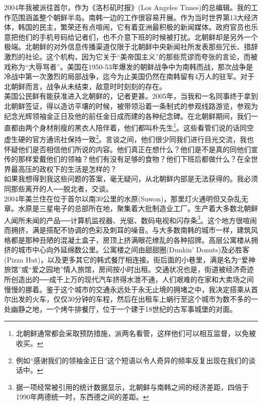 2004年我被派往首尔，作为《洛杉矶时报》(Los Angeles Times)的总编辑。我的工作范围涵盖整个朝鲜半岛。南韩一边的工作很容易开展。作为当时世界第13大经济体，韩国的民主，繁荣还有点喧闹，它有着亚洲最积极的新闻媒体。政府官员也乐意把他们的手机号码给记者们，也不介意下班的时候被打扰。北朝鲜却是另外一个极端。北朝鲜的对外信息传播渠道仅限于北朝鲜中央新闻社所发表那些冗长、措辞激烈的社论。这个机构，因为它关于“美帝国主义”的那些荒谬而夸张的言论，而被戏称为“大辱骂者”。美国在1950-53年爆发的朝鲜战争中为南韩而战，那次战争是冷战中第一次激烈的局部战争，迄今为止美国仍然在南韩留有4万人的驻军。对于北朝鲜而言，战争从未结束，敌意时时刻刻的存在。\\

美国公民鲜有能获准进入北朝鲜的，记者更甚。2005年，当我和一名同事终于拿到北朝鲜签证，得以造访平壤的时候，被带领沿着一条制式的参观线路游览，参观为纪念光辉领袖金正日及他的前任金日成而建的各种纪念碑。在北朝鲜期间，我们一直都由两个身材削瘦的黑衣人陪伴着，他们都叫朴先生\footnote{北朝鲜通常都会采取预防措施，派两名看管，这样他们可以相互监督，以免被收买。}。这些看管们说的话同空虚生硬的官方通讯社保持一致\footnote{例如“感谢我们的领袖金正日”这个短语以令人奇异的频率反复出现在我们的谈话中。}。言谈之间，他们很少同我们进行目光交流，我也怀疑他们是否相信他们所说的内容。他们真正在想什么？他们是不是真的同他们宣传的那样爱戴他们的领袖？他们有没有足够的食物？他们下班后都做什么？在全世界最高压的政权下的生活是怎样的？\\

如果我想得到我这些问题的答案，毫无疑问，从北朝鲜内部是无法获得的。我必须同那些离开的人──脱北者，交谈。\\

2004年美兰住在位于首尔以南30公里的水原(Suwon)，那里灯火通明但又杂乱无章。水原是三星电子的总部所在地，聚集着大批制造业工厂。生产着大多数北朝鲜人闻所未闻的产品──计算机监视器、光驱、数码电视和闪存条\footnote{据一项经常被引用的统计数据显示，北朝鲜与南韩之间的经济差距，四倍于1990年两德统一时，东西德之间的差距。}。这个地方很喧闹而拥挤，满是搭配不协调的色彩及刺耳的噪音。与大多数南韩的城市一样，建筑风格都是那种丑陋的混凝土盒子，房顶上挤满眼花缭乱的各种招牌。高层公寓楼从拥挤的城市中心向外延绵数公里。公寓楼之间由甜甜圈(Dunkin{\EN '} Donuts)及必胜客(Pizza Hut)，以及更多其它的韩式餐厅相连接。街后面的小巷里，满是名为“爱神旅馆”或“爱之园地”情人旅馆，房间按小时出租。交通状况也是，街道被经济奇迹所创造出的──成千上万的现代汽车挤得水泄不通，人们艰难的在家和大卖场之间慢慢的挪着。鉴于这个城市的交通永远处于永无止境的拥堵之中，我决定搭乘从首尔出发的火车，仅仅30分钟的车程，然后在出租车上蜗行至这个城市为数不多的一处幽静之地，一个烤牛排餐厅，位于一个建于18世纪的古军事城堡的对面。\\

